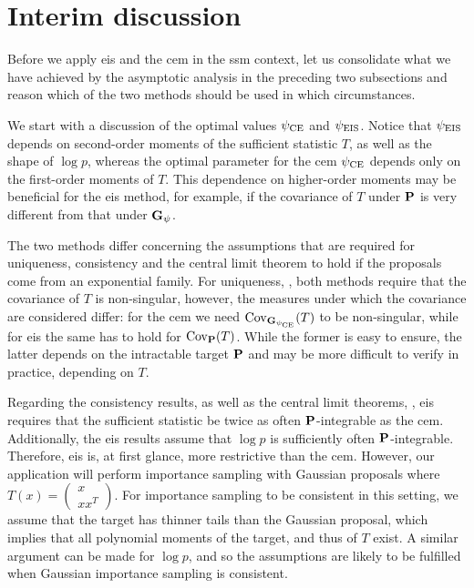 \section{Interim discussion}

Before we apply \acrshort{eis} and the \acrshort{cem} in the \acrshort{ssm} context, let us consolidate what we have achieved by the asymptotic analysis in the preceding two subsections and reason which of the two methods should be used in which circumstances.

We start with a discussion of the optimal values $\pce$ and $\peis$.
Notice that $\peis$ depends on second-order moments of the sufficient statistic $T$, as well as the shape of $\log p$, whereas the optimal parameter for the \gls{cem} $\pce$ depends only on the first-order moments of $T$. 
This dependence on higher-order moments may be beneficial for the \acrshort{eis} method, for example, if the covariance of $T$ under $\P$ is very different from that under $\G_{\psi}$. 


The two methods differ concerning the assumptions that are required for uniqueness, consistency and the central limit theorem to hold if the proposals come from an exponential family. 
For uniqueness, , both methods require that the covariance of $T$ is non-singular, however, the measures under which the covariance are considered differ: for the \acrshort{cem} we need $\cov_{\G_{\pce}} (T)$ to be non-singular, while for \acrshort{eis} the same has to hold for $\cov_{\P} (T)$. While the former is easy to ensure, the latter depends on the intractable target $\P$ and may be more difficult to verify in practice, depending on $T$. 

Regarding the consistency results,  as well as the central limit theorems, , \acrshort{eis} requires that the sufficient statistic be twice as often $\P$-integrable as the \acrshort{cem}. Additionally, the \acrshort{eis} results assume that $\log p$ is sufficiently often $\P$-integrable. Therefore, \acrshort{eis} is, at first glance, more restrictive than the \acrshort{cem}. However, our application will perform importance sampling with Gaussian proposals where $T(x) = \begin{pmatrix} x \\ xx^{T}\end{pmatrix}$. For importance sampling to be consistent in this setting, we assume that the target has thinner tails than the Gaussian proposal, which implies that all polynomial moments of the target, and thus of $T$ exist. A similar argument can be made for $\log p$, and so the assumptions are likely to be fulfilled when Gaussian importance sampling is consistent.

